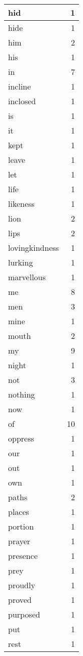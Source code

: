 \begin{center}
\begin{longtable}{l|r}
hid & 1\\ \hline 
hide & 1\\ \hline 
him & 2\\ \hline 
his & 1\\ \hline 
in & 7\\ \hline 
incline & 1\\ \hline 
inclosed & 1\\ \hline 
is & 1\\ \hline 
it & 1\\ \hline 
kept & 1\\ \hline 
leave & 1\\ \hline 
let & 1\\ \hline 
life & 1\\ \hline 
likeness & 1\\ \hline 
lion & 2\\ \hline 
lips & 2\\ \hline 
lovingkindness & 1\\ \hline 
lurking & 1\\ \hline 
marvellous & 1\\ \hline 
me & 8\\ \hline 
men & 3\\ \hline 
mine & 1\\ \hline 
mouth & 2\\ \hline 
my & 9\\ \hline 
night & 1\\ \hline 
not & 3\\ \hline 
nothing & 1\\ \hline 
now & 1\\ \hline 
of & 10\\ \hline 
oppress & 1\\ \hline 
our & 1\\ \hline 
out & 1\\ \hline 
own & 1\\ \hline 
paths & 2\\ \hline 
places & 1\\ \hline 
portion & 1\\ \hline 
prayer & 1\\ \hline 
presence & 1\\ \hline 
prey & 1\\ \hline 
proudly & 1\\ \hline 
proved & 1\\ \hline 
purposed & 1\\ \hline 
put & 1\\ \hline 
rest & 1\\ \hline 

\end{longtable}
\end{center}
